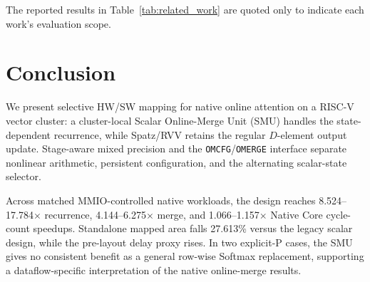 \documentclass[journal]{IEEEtran}
\begin{document}
The reported results in Table~\ref{tab:related_work} are quoted only to
indicate each work's evaluation scope.


\section{Conclusion}

We present selective HW/SW mapping for native online attention on a RISC-V
vector cluster: a cluster-local Scalar Online-Merge Unit (SMU) handles the
state-dependent recurrence, while Spatz/RVV retains the regular $D$-element
output update. Stage-aware mixed precision and the \texttt{OMCFG}/\texttt{OMERGE}
interface separate nonlinear arithmetic, persistent configuration, and the
alternating scalar-state selector.

Across matched MMIO-controlled native workloads, the design reaches
8.524--17.784$\times$ recurrence, 4.144--6.275$\times$ merge, and
1.066--1.157$\times$ Native Core cycle-count speedups. Standalone mapped area
falls 27.613\% versus the legacy scalar design, while the pre-layout delay
proxy rises. In two explicit-P cases, the SMU gives no consistent benefit as a
general row-wise Softmax replacement, supporting a dataflow-specific
interpretation of the native online-merge results.



\end{document}
